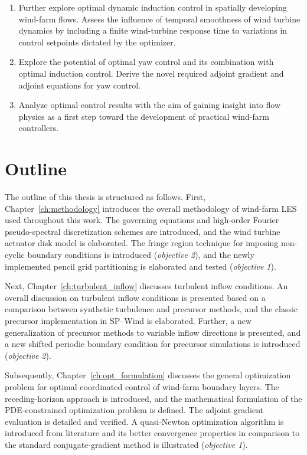 \begin{enumerate}
	\item Further explore optimal dynamic induction control in spatially developing wind-farm flows. Assess the influence of temporal smoothness of wind turbine dynamics by including a finite wind-turbine response time to variations in control setpoints dictated by the optimizer. 
	\item Explore the potential of optimal yaw control and its combination with optimal induction control. Derive the novel required adjoint gradient and adjoint equations for yaw control.
	\item Analyze optimal control results with the aim of gaining insight into flow physics as a first step toward the development of practical wind-farm controllers.
\end{enumerate}

\section{Outline}\label{sec:intro_outline}
The outline of this thesis is structured as follows. First, Chapter~\ref{ch:methodology} introduces the overall methodology of wind-farm LES used throughout this work. The governing equations and high-order Fourier pseudo-spectral discretization schemes are introduced, and the wind turbine actuator disk model is elaborated. The fringe region technique for imposing non-cyclic boundary conditions is introduced (\emph{objective 2}), and the newly implemented pencil grid partitioning is elaborated and tested (\emph{objective 1}). 

Next, Chapter~\ref{ch:turbulent_inflow} discusses turbulent inflow conditions. An overall discussion on turbulent inflow conditions is presented based on a comparison between synthetic turbulence and precursor methods, and the classic precursor implementation in SP--Wind is elaborated. Further, a new generalization of precursor methods to variable inflow directions is presented, and a new shifted periodic boundary condition for precursor simulations is introduced (\emph{objective 2}).

Subsequently, Chapter~\ref{ch:opt_formulation} discusses the general optimization problem for optimal coordinated control of wind-farm boundary layers. The receding-horizon approach is introduced, and the mathematical formulation of the PDE-constrained optimization problem is defined. The adjoint gradient evaluation is detailed and verified. A quasi-Newton optimization algorithm is introduced from literature and its better convergence properties in comparison to the standard conjugate-gradient method is illustrated (\emph{objective 1}). 

